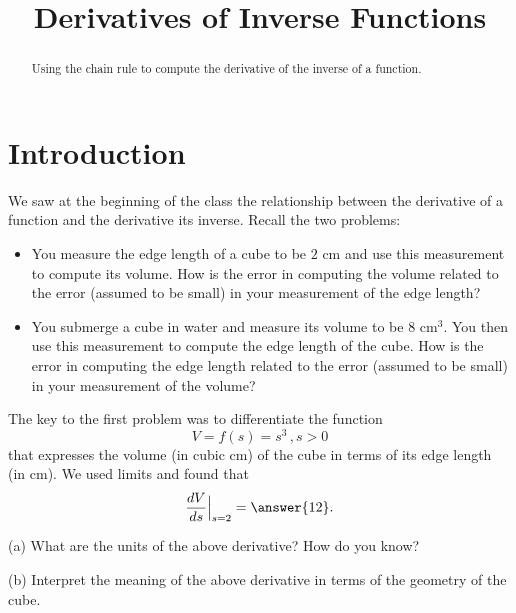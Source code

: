\documentclass{ximera}
\title{Derivatives of Inverse Functions}
\begin{document}
\begin{abstract}
Using the chain rule to compute the derivative of the inverse of a function.
\end{abstract}
\maketitle


\section*{Introduction}
We saw at the beginning of the class the relationship between the derivative of a function and the derivative its inverse. Recall the two problems:

\begin{itemize}
\item{You measure the edge length of a cube to be $2$ cm and use this measurement to compute its volume. How is the error in computing the volume related to the error (assumed to be small) in your measurement of the edge length?}

\item{You submerge a cube in water and measure its volume to be $8 \text{ cm}^3$. You then use this measurement to compute the edge length of the cube. How is the error in computing the edge length related to the error (assumed to be small) in your measurement of the volume?}

\end{itemize}

The key to the first problem was to differentiate the function
\[
      V = f(s) = s^3 \, , s>0
\] 
that expresses the volume (in cubic cm) of the cube in terms of its edge length (in cm). We used limits and found that
\[
   \frac{dV}{ds}\Big|_{s=2} = \answer{12}.
\]

\begin{question} \label{Q34rgbds}
(a) What are the units of the above derivative? How do you know?

(b) Interpret the meaning of the above derivative in terms of the geometry of the cube.
\end{question}
\end{document}
